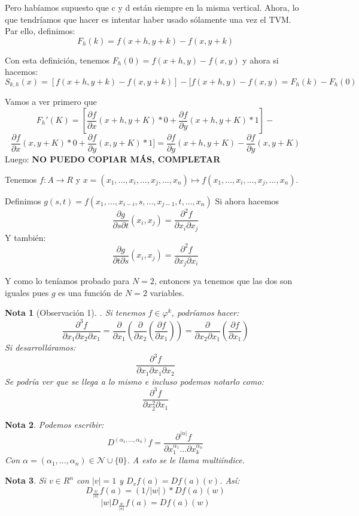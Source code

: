\documentclass[11pt, a4paper, titlepage]{article}
\makeatletter
\renewenvironment{proof}[1][\proofname] {\vspace{-15pt}\par\pushQED{\qed}\normalfont\topsep6\p@\@plus6\p@\relax\trivlist\item[\hskip\labelsep\it#1\@addpunct{.}]\ignorespaces}{\popQED\endtrivlist\@endpefalse}
\theoremstyle{theorem-style}
\theoremstyle{definition-style}
\theoremstyle{remark-style}
\newtheorem*{nota}{Nota}
\theoremstyle{example-style}
\makeatother
\begin{document}
\begin{proof}
Pero habíamos supuesto que c y d están siempre en la misma vertical. Ahora, lo que tendríamos que hacer es intentar haber usado sólamente una vez el TVM.
Par ello, definimos:
\[
F_h(k) = f(x+h,y+k)-f(x,y+k)
\]

Con esta definición, tenemos $F_h(0) = f(x+h,y)-f(x,y)$ y ahora si hacemos:
\[
S_{k,h}(x) =[f(x+h,y+k) - f(x,y+k)] - [f(x+h,y) -f(x,y) = F_h(k) - F_h(0)
\]

Vamos a ver primero que
\[
F_h'(K) = [\frac{\partial f}{\partial x}(x+h,y+K)*0 + \frac{\partial f}{\partial y}(x+h,y+K)*1] - 
\]
\[
\frac{\partial f}{\partial x}(x,y+K)*0 + \frac{\partial f}{ \partial y}(x,y+K)*1] = \frac{\partial f}{\partial y}(x+h,y+K) - \frac{\partial f}{\partial y}(x,y+K)
\]
Luego:
\textbf{NO PUEDO COPIAR MÁS, COMPLETAR}

\end{proof}
\begin{proof}[Demostración para el caso general]
	Tenemos $f:A \to R$ y $x=(x_1,...,x_i,...,x_j,...,x_n) \mapsto f(x_1,...,x_i,...,x_j,...,x_n)$.
	
	Definimos $g(s,t) = f(x_1,...,x_{i-i},s,...,x_{j-1},t,...,x_n)$
	Si ahora hacemos
	\[
	\frac{\partial g}{\partial s \partial t}(x_i,x_j) = \frac{\partial^2 f}{\partial x_i \partial x_j}
	\]
	Y también:
		\[
	\frac{\partial g}{\partial t \partial s}(x_i,x_j) = \frac{\partial^2 f}{\partial x_j \partial x_i}
	\]
	
	Y como lo teníamos probado para $N=2$, entonces ya tenemos que las dos son iguales pues $g$ es una función de $N=2$ variables.
	

\end{proof}

\begin{nota}[Observación 1]. Si tenemos $f \in \varphi^k$, podríamos hacer:
\[
\frac{\partial^3 f}{\partial x_1 \partial x_2 \partial x_1} = \frac{\partial}{\partial x_1}(\frac{\partial}{\partial x_2}(\frac{\partial f}{\partial x_1})) = \frac{\partial}{\partial x_2 \partial x_1}(\frac{\partial f}{\partial x_1})
\]
Si desarrolláramos:
\[
\frac{\partial^3 f}{\partial x_1 \partial x_1 \partial x_2}
\]
Se podría ver que se llega a lo mismo e incluso podemos notarlo como:
\[
\frac{\partial^3 f}{\partial x_2^2 \partial x_1}
\]
\end{nota}
\begin{nota}
	Podemos escribir:
	\[
	D^{(\alpha_1,...,\alpha_n)}f = \frac{\partial^{|\alpha|}f}{\partial x_1^{\alpha_1}... \partial x_k^{\alpha_n}}
	\]
	Con $\alpha = (\alpha_1,...,\alpha_n) \in \mathcal{N}\cup \{0\}$. A esto se le llama multiíndice.
	
\end{nota}
\begin{nota}
	Si $v\in R^n$ con $|v| = 1 $ y $D_vf(a) = Df(a)(v)$. Así:
	\[
	D_{\frac{w}{|w|}}f(a) = (1/|w|)*Df(a)(w)
	\]\[
	|w|D_{\frac{w}{|w|}}f(a) = Df(a)(w)
	\]
\end{nota}
\end{document}
